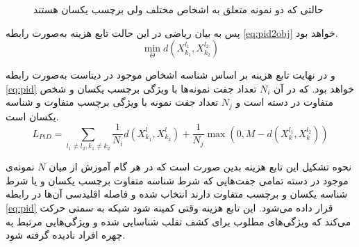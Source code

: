 \begin{figure}[ht]

	\caption{حالتی که دو نمونه متعلق به اشخاص مختلف ولی برچسب یکسان هستند}
	\label{fig:pid2}
\end{figure}
پس به بیان ریاضی در این حالت تابع هزینه به‌صورت رابطه
\ref{eq:pid2obj}
خواهد بود.
\begin{equation}\label{eq:pid2obj}
\min_{\Theta} {d( X_{k_1}^{l_1},X_{k_2}^{l_2} )} 
\end{equation}

  و در نهایت تابع هزینه بر اساس شناسه اشخاص موجود در دیتاست به‌صورت رابطه
\ref{eq:pid}
  خواهد بود. که در آن  
 $N_i$
   تعداد جفت نمونه‌ها با ویژگی برچسب یکسان و شخص متفاوت در دسته است و 
   $N_j$
       تعداد جفت نمونه با ویژگی برچسب متفاوت و شناسه یکسان است.
\begin{equation}\label{eq:pid}
  	L_{PiD} = \sum_{l_1 \ne l_2,k_1 \ne k_2}{\frac{1}{N_i}d( X_{k_1}^{l},X_{k_2}^{l})+\frac{1}{N_j}\max(0,M-d( X_{k}^{l_1},X_{k}^{l_2} ))}
\end{equation}

 نحوه تشکیل این تابع هزینه بدین صورت است که در هر گام آموزش از میان $N$ نمونه‌ی موجود در دسته تمامی جفت‌هایی که شرط شناسه متفاوت برچسب یکسان و یا شرط شناسه یکسان و برچسب متفاوت دارند انتخاب شده و فاصله اقلیدسی آن‌ها در رابطه
\ref{eq:pid}
 قرار داده می‌شود. این تابع هزینه وقتی کمینه شود شبکه به سمتی حرکت می‌کند که ویژگی‌های مطلوب برای کشف تقلب شناسایی شده و ویژگی‌هایی مرتبط به چهره افراد نادیده گرفته شود.
 
